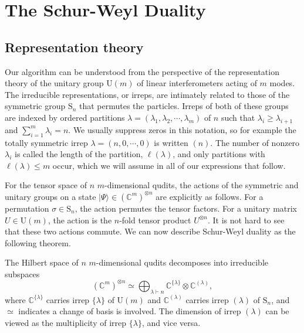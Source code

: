 \section{The Schur-Weyl Duality}
\label{sec:sw-duality}

\subsection{Representation theory}

Our algorithm can be understood from the perspective of the representation theory of the unitary group U$(m)$ of linear interferometers acting of $m$ modes.
The irreducible representations, or irreps, are intimately related to those of the symmetric group $\textrm{S}_n$ that permutes the particles.
Irreps of both of these groups are indexed by ordered partitions $\lambda = (\lambda_1,\lambda_2,\cdots,\lambda_m)$ of $n$ such that $\lambda_i \geq \lambda_{i+1}$ and $\sum_{i = 1}^m \lambda_i = n$.
We usually suppress zeros in this notation, so for example the totally symmetric irrep $\lambda=(n, 0,\cdots,0)$ is written $(n)$. 
The number of nonzero $\lambda_i$ is called the length of the partition, $\ell(\lambda)$, and only partitions with $\ell(\lambda) \leq m$ occur, which we will assume in all of our expressions that follow.

For the tensor space of $n$ $m$-dimensional qudits, the actions of the symmetric and unitary groups on a state $|\Psi\rangle \in (\mathbb{C}^m)^{\otimes n}$ are explicitly as follows. 
For a permutation $\sigma \in \textrm{S}_n$, the action permutes the tensor factors. 
For a unitary matrix $U \in \textrm{U}(m)$, the action is the $n$-fold tensor product $U^{\otimes n}$. 
It is not hard to see that these two actions commute.
We can now describe Schur-Weyl duality as the following theorem.
\begin{theorem}
The Hilbert space of $n$ $m$-dimensional qudits decomposes into irreducible subspaces
\begin{equation}
(\mathbb{C}^m)^{\otimes n} \simeq \bigoplus_{\lambda\vdash n} \mathbb{C}^{\{\lambda\}} \otimes \mathbb{C}^{(\lambda)} ,
\end{equation}
where $\mathbb{C}^{\{\lambda\}}$ carries irrep $\{\lambda\}$ of $\textrm{U}(m)$ and $\mathbb{C}^{(\lambda)}$ carries irrep $(\lambda)$ of $\textrm{S}_n$, and $\simeq$ indicates a change of basis is involved.
The dimension of irrep $(\lambda)$ can be viewed as the multiplicity of irrep $\{\lambda\}$, and vice versa.
\end{theorem}

